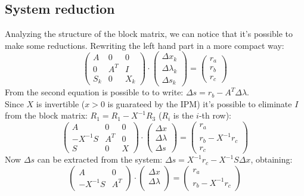 \documentclass[]{article}
\begin{document}
\subsection{System reduction}
Analyzing the structure of the block matrix, we can notice that it's possible to make some reductions. Rewriting the left hand part in a more compact way:
\begin{equation*}
\begin{pmatrix}
A & 0 & 0 \\[0.3em]
0 & A^T & I \\[0.3em]
S_k & 0 & X_k           
\end{pmatrix}
\cdot 
\begin{pmatrix}
\Delta x_k \\[0.3em]
\Delta \lambda_k \\[0.3em]
\Delta s_k           
\end{pmatrix}
= 
\begin{pmatrix}
r_a \\[0.3em]
r_b \\[0.3em]
r_c         
\end{pmatrix}
\end{equation*}
From the second equation is possible to to write: $\Delta s = r_b - A^T\Delta\lambda$.\\
Since $X$ is invertible ($x > 0$ is guarateed by the IPM) it's possible to eliminate $I$ from the block matrix: $R_1 = R_1 -X^{-1}R_3$ ($R_i$ is the $i$-th row):
\begin{equation*}
\begin{pmatrix}
A & 0 & 0 \\[0.3em]
-X^{-1}S & A^T & 0 \\[0.3em]
S & 0 & X           
\end{pmatrix}
\cdot 
\begin{pmatrix}
\Delta x \\[0.3em]
\Delta \lambda \\[0.3em]
\Delta s           
\end{pmatrix}
= 
\begin{pmatrix}
r_a \\[0.3em]
r_b-X^{-1}r_c \\[0.3em]
r_c         
\end{pmatrix}
\end{equation*}
Now $\Delta s$ can be extracted from the system: $\Delta s = X^{-1}r_c-X^{-1}S\Delta x$, obtaining:
\begin{equation*}
	\begin{pmatrix}
	A & 0\\
	-X^{-1}S & A^T
	\end{pmatrix}
	\cdot
	\begin{pmatrix}
	\Delta x \\[0.3em]
	\Delta \lambda \\[0.3em]
	\end{pmatrix}
	=
	\begin{pmatrix}
	r_a\\
	r_b-X^{-1}r_c
	\end{pmatrix}
\end{equation*}
\end{document}
